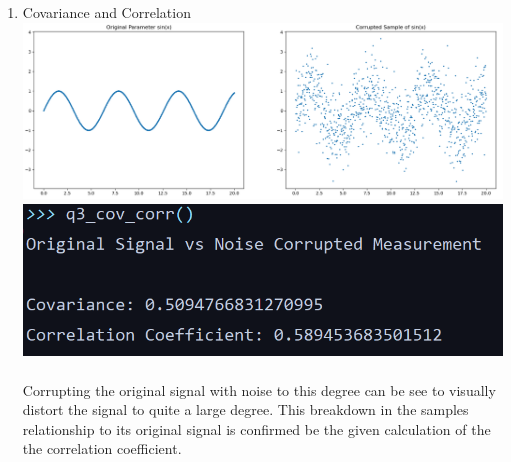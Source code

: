\documentclass[11pt]{article}
\begin{document}
\begin{preview}
\begin{enumerate}
        \item Covariance and Correlation \\
        \includegraphics[width=\linewidth]{inc/q3_plot.png} \\
        \includegraphics[width=\linewidth]{inc/q3_out.png} \\ \\
        Corrupting the original signal with noise to this degree can be see to visually distort the signal to quite a large degree. This breakdown in the samples relationship to its original signal is confirmed be the given calculation of the the correlation coefficient.


\end{enumerate}
\end{preview}
\end{document}
